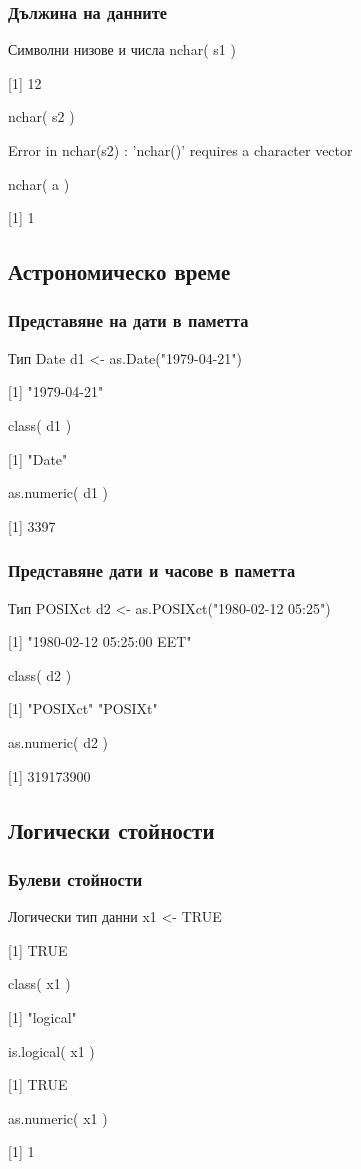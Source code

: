 \documentclass{beamer}
\begin{document}
\begin{frame}
\frametitle{Дължина на данните}
\begin{block}{Символни низове и числа}
nchar( s1 )

[1] 12

nchar( s2 )

Error in nchar(s2) : 'nchar()' requires a character vector

nchar( a )

[1] 1
\end{block}
\end{frame}

\subsection{Астрономическо време}

\begin{frame}
\frametitle{Представяне на дати в паметта}
\begin{block}{Тип Date}
d1 <- as.Date("1979-04-21")

[1] "1979-04-21"

class( d1 )

[1] "Date"

as.numeric( d1 )

[1] 3397
\end{block}
\end{frame}

\begin{frame}
\frametitle{Представяне дати и часове в паметта}
\begin{block}{Тип POSIXct}
d2 <- as.POSIXct("1980-02-12 05:25")

[1] "1980-02-12 05:25:00 EET"

class( d2 )

[1] "POSIXct" "POSIXt" 

as.numeric( d2 )

[1] 319173900
\end{block}
\end{frame}

\subsection{Логически стойности}

\begin{frame}
\frametitle{Булеви стойности}
\begin{block}{Логически тип данни}
x1 <- TRUE

[1] TRUE

class( x1 )

[1] "logical"

is.logical( x1 )

[1] TRUE

as.numeric( x1 )

[1] 1
\end{block}
\end{frame}
\end{document}

